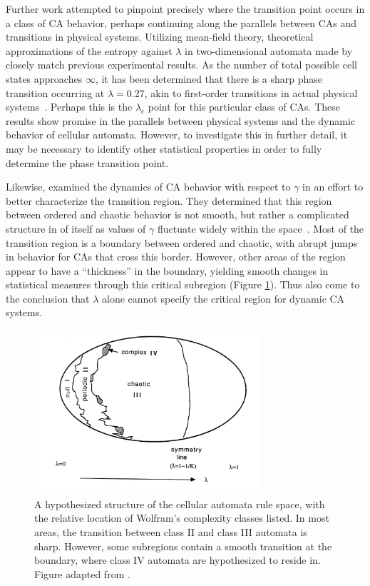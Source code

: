 \documentclass[a4paper,11pt]{report}
\begin{document}
Further work attempted to pinpoint precisely where the transition point occurs in a class of CA behavior, perhaps continuing along the parallels between CAs and transitions in physical systems. Utilizing mean-field theory, theoretical approximations of the entropy against $\lambda$ in two-dimensional automata made by \citeauthor{wo90} closely match previous experimental results. As the number of total possible cell states approaches $\infty$, it has been determined that there is a sharp phase transition occurring at $\lambda=0.27$, akin to first-order transitions in actual physical systems~\cite{wo90}. Perhaps this is the $\lambda_c$ point for this particular class of CAs. These results show promise in the parallels between physical systems and the dynamic behavior of cellular automata. However, to investigate this in further detail, it may be necessary to identify other statistical properties in order to fully determine the phase transition point.

Likewise, \citeauthor{li90b} examined the dynamics of CA behavior with respect to $\gamma$ in an effort to better characterize the transition region. They determined that this region between ordered and chaotic behavior is not smooth, but rather a complicated structure in of itself as values of $\gamma$ fluctuate widely within the space~\cite{li90b}. Most of the transition region is a boundary between ordered and chaotic, with abrupt jumps in behavior for CAs that cross this border. However, other areas of the region appear to have a ``thickness'' in the boundary, yielding smooth changes in statistical measures through this critical subregion (Figure \ref{fig:ca_space}). Thus \citeauthor{li90b} also come to the conclusion that $\lambda$ alone cannot specify the critical region for dynamic CA systems.

\begin{figure}[htp]
\centering
\includegraphics[width=0.75\textwidth]{li90b_fig11.png}
\caption[Hypothesized CA Space]{
A hypothesized structure of the cellular automata rule space, with the relative location of Wolfram's complexity classes listed. In most areas, the transition between class II and class III automata is sharp. However, some subregions contain a smooth transition at the boundary, where class IV automata are hypothesized to reside in. Figure adapted from \citeauthor{li90b} \cite{li90b}.
}
\label{fig:ca_space}
\end{figure}
\end{document}
